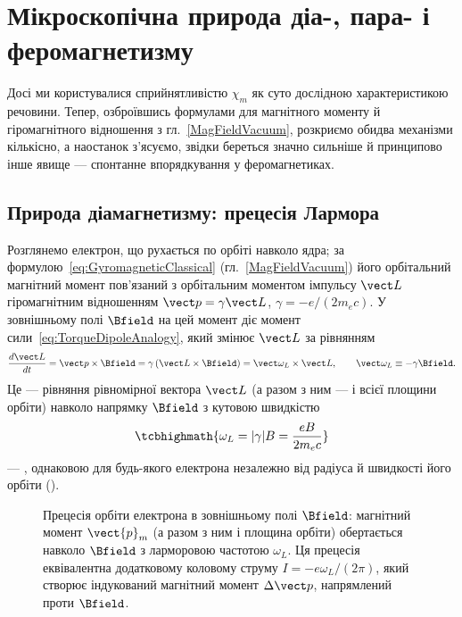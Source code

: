 \section{Мікроскопічна природа діа-, пара- і феромагнетизму}

Досі ми користувалися сприйнятливістю $\chi_m$ як суто дослідною характеристикою речовини. Тепер, озброївшись формулами для магнітного
моменту й гіромагнітного відношення з гл.~\ref{MagFieldVacuum}, розкриємо обидва механізми кількісно, а наостанок з'ясуємо, звідки береться значно сильніше й принципово інше явище ---
спонтанне впорядкування у феромагнетиках.

\subsection*{Природа діамагнетизму: прецесія Лармора}

Розглянемо електрон, що рухається по орбіті навколо ядра; за формулою~\eqref{eq:GyromagneticClassical} (гл.~\ref{MagFieldVacuum}) його орбітальний
магнітний момент пов'язаний з орбітальним моментом імпульсу $\vect L$ гіромагнітним відношенням $\vect p = \gamma\vect L$, $\gamma=-e/(2m_ec)$. У
зовнішньому полі $\Bfield$ на цей момент діє момент сили~\eqref{eq:TorqueDipoleAnalogy}, який змінює $\vect L$ за рівнянням
\begin{equation*}
	\frac{d\vect L}{dt} = \vect p\times\Bfield = \gamma\left(\vect L\times\Bfield\right) = \vect\omega_L\times\vect L, \qquad
	\vect\omega_L\equiv-\gamma\Bfield.
\end{equation*}
Це --- рівняння рівномірної  вектора $\vect L$ (а разом з ним --- і всієї площини орбіти) навколо напрямку $\Bfield$ з кутовою
швидкістю
\begin{equation}\label{eq:LarmorFreqMag}
	\tcbhighmath{
		\omega_L = |\gamma|B = \frac{eB}{2m_ec}
	}
\end{equation}
--- , однаковою для будь-якого електрона незалежно від радіуса й швидкості його орбіти ().

\begin{figure}[h!]\centering
\caption{Прецесія орбіти електрона в зовнішньому полі $\Bfield$: магнітний
момент $\vect{p}_m$ (а разом з ним і площина орбіти) обертається навколо
$\Bfield$ з ларморовою частотою $\omega_L$. Ця прецесія еквівалентна
додатковому коловому струму $I=-e\omega_L/(2\pi)$, який створює індукований
магнітний момент $\Delta\vect p$, напрямлений проти $\Bfield$.}
\label{pic:LarmorPrecession}
\end{figure}



